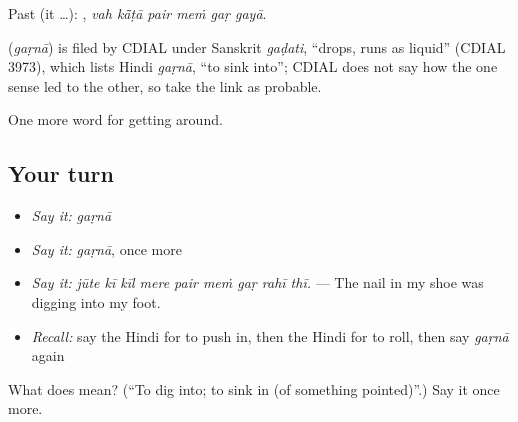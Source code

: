 Past (it …):      , \emph{vah kā̃ṭā pair meṁ gaṛ gayā}.

\begin{cousinweb}
\textbf{} (\emph{gaṛnā}) is filed by CDIAL under Sanskrit \emph{gaḍati}, \textquotedblleft{}drops, runs as liquid\textquotedblright{} (CDIAL 3973), which lists Hindi \emph{gaṛnā}, \textquotedblleft{}to sink into\textquotedblright{}; CDIAL does not say how the one sense led to the other, so take the link as probable.
\end{cousinweb}

\begin{grammarlens}[title={What you've built}]
One more word for getting around.
\end{grammarlens}

\subsection*{Your turn}
\begin{itemize}
\raggedright
  \item \emph{Say it:} \emph{gaṛnā}
  \item \emph{Say it:} \emph{gaṛnā}, once more
  \item \emph{Say it:} \emph{jūte kī kīl mere pair meṁ gaṛ rahī thī.} — The nail in my shoe was digging into my foot.
  \item \emph{Recall:} say the Hindi for to push in, then the Hindi for to roll, then say \emph{gaṛnā} again
\end{itemize}

\begin{tcolorbox}[breakable,colback=teal!4,colframe=teal!35!black,title={Before you move on}]
What does  mean? (\textquotedblleft{}To dig into; to sink in (of something pointed)\textquotedblright{}.) Say it once more.
\end{tcolorbox}
